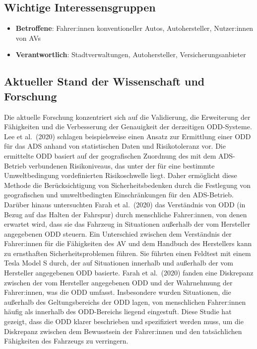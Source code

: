 \documentclass[
]{book}
\providecommand{\tightlist}{%
  \setlength{\itemsep}{0pt}\setlength{\parskip}{0pt}}
\begin{document}
\hypertarget{wichtige-interessensgruppen-1}{%
\subsection*{Wichtige Interessensgruppen}\label{wichtige-interessensgruppen-1}}

\begin{itemize}
\tightlist
\item
  \textbf{Betroffene}: Fahrer:innen konventioneller Autos, Autohersteller, Nutzer:innen von AVs
\item
  \textbf{Verantwortlich}: Stadtverwaltungen, Autohersteller, Versicherungsanbieter
\end{itemize}

\hypertarget{aktueller-stand-der-wissenschaft-und-forschung-1}{%
\subsection*{Aktueller Stand der Wissenschaft und Forschung}\label{aktueller-stand-der-wissenschaft-und-forschung-1}}

Die aktuelle Forschung konzentriert sich auf die Validierung, die Erweiterung der Fähigkeiten und die Verbesserung der Genauigkeit der derzeitigen ODD-Systeme. Lee et al.~(2020) schlagen beispielsweise einen Ansatz zur Ermittlung einer ODD für das ADS anhand von statistischen Daten und Risikotoleranz vor. Die ermittelte ODD basiert auf der geografischen Zuordnung des mit dem ADS-Betrieb verbundenen Risikoniveaus, das unter der für eine bestimmte Umweltbedingung vordefinierten Risikoschwelle liegt. Daher ermöglicht diese Methode die Berücksichtigung von Sicherheitsbedenken durch die Festlegung von geografischen und umweltbedingten Einschränkungen für den ADS-Betrieb. Darüber hinaus untersuchten Farah et al.~(2020) das Verständnis von ODD (in Bezug auf das Halten der Fahrspur) durch menschliche Fahrer:innen, von denen erwartet wird, dass sie das Fahrzeug in Situationen außerhalb der vom Hersteller angegebenen ODD steuern. Ein Unterschied zwischen dem Verständnis der Fahrer:innen für die Fähigkeiten des AV und dem Handbuch des Herstellers kann zu ernsthaften Sicherheitsproblemen führen. Sie führten einen Feldtest mit einem Tesla Model S durch, der auf Situationen innerhalb und außerhalb der vom Hersteller angegebenen ODD basierte. Farah et al.~(2020) fanden eine Diskrepanz zwischen der vom Hersteller angegebenen ODD und der Wahrnehmung der Fahrer:innen, was die ODD umfasst. Insbesondere wurden Situationen, die außerhalb des Geltungsbereichs der ODD lagen, von menschlichen Fahrer:innen häufig als innerhalb des ODD-Bereichs liegend eingestuft. Diese Studie hat gezeigt, dass die ODD klarer beschrieben und spezifiziert werden muss, um die Diskrepanz zwischen dem Bewusstsein der Fahrer:innen und den tatsächlichen Fähigkeiten des Fahrzeugs zu verringern.
\end{document}
